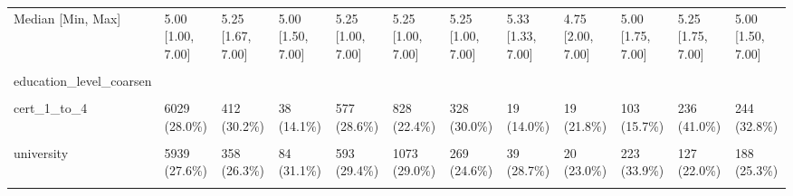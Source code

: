 \documentclass[
  single column]{article}
\begin{document}
\begin{landscape}
\begin{longtable}[t]{llllllllllll}
Median [Min, Max] & 5.00 [1.00, 7.00] & 5.25 [1.67, 7.00] & 5.00 [1.50, 7.00] & 5.25 [1.00, 7.00] & 5.25 [1.00, 7.00] & 5.25 [1.00, 7.00] & 5.33 [1.33, 7.00] & 4.75 [2.00, 7.00] & 5.00 [1.75, 7.00] & 5.25 [1.75, 7.00] & 5.00 [1.50, 7.00]\\
\cellcolor{gray!10}{Missing} & \cellcolor{gray!10}{66 (0.3\%)} & \cellcolor{gray!10}{3 (0.2\%)} & \cellcolor{gray!10}{0 (0\%)} & \cellcolor{gray!10}{7 (0.3\%)} & \cellcolor{gray!10}{18 (0.5\%)} & \cellcolor{gray!10}{1 (0.1\%)} & \cellcolor{gray!10}{0 (0\%)} & \cellcolor{gray!10}{0 (0\%)} & \cellcolor{gray!10}{3 (0.5\%)} & \cellcolor{gray!10}{4 (0.7\%)} & \cellcolor{gray!10}{4 (0.5\%)}\\
education\_level\_coarsen &  &  &  &  &  &  &  &  &  &  & \\
\addlinespace
\cellcolor{gray!10}{no\_qualification} & \cellcolor{gray!10}{322 (1.5\%)} & \cellcolor{gray!10}{15 (1.1\%)} & \cellcolor{gray!10}{1 (0.4\%)} & \cellcolor{gray!10}{24 (1.2\%)} & \cellcolor{gray!10}{41 (1.1\%)} & \cellcolor{gray!10}{30 (2.7\%)} & \cellcolor{gray!10}{0 (0\%)} & \cellcolor{gray!10}{2 (2.3\%)} & \cellcolor{gray!10}{26 (4.0\%)} & \cellcolor{gray!10}{8 (1.4\%)} & \cellcolor{gray!10}{23 (3.1\%)}\\
cert\_1\_to\_4 & 6029 (28.0\%) & 412 (30.2\%) & 38 (14.1\%) & 577 (28.6\%) & 828 (22.4\%) & 328 (30.0\%) & 19 (14.0\%) & 19 (21.8\%) & 103 (15.7\%) & 236 (41.0\%) & 244 (32.8\%)\\
\cellcolor{gray!10}{cert\_5\_to\_6} & \cellcolor{gray!10}{2659 (12.3\%)} & \cellcolor{gray!10}{209 (15.3\%)} & \cellcolor{gray!10}{24 (8.9\%)} & \cellcolor{gray!10}{279 (13.8\%)} & \cellcolor{gray!10}{554 (15.0\%)} & \cellcolor{gray!10}{176 (16.1\%)} & \cellcolor{gray!10}{10 (7.4\%)} & \cellcolor{gray!10}{7 (8.0\%)} & \cellcolor{gray!10}{32 (4.9\%)} & \cellcolor{gray!10}{94 (16.3\%)} & \cellcolor{gray!10}{106 (14.2\%)}\\
university & 5939 (27.6\%) & 358 (26.3\%) & 84 (31.1\%) & 593 (29.4\%) & 1073 (29.0\%) & 269 (24.6\%) & 39 (28.7\%) & 20 (23.0\%) & 223 (33.9\%) & 127 (22.0\%) & 188 (25.3\%)\\
\cellcolor{gray!10}{post\_grad} & \cellcolor{gray!10}{3120 (14.5\%)} & \cellcolor{gray!10}{176 (12.9\%)} & \cellcolor{gray!10}{39 (14.4\%)} & \cellcolor{gray!10}{276 (13.7\%)} & \cellcolor{gray!10}{565 (15.3\%)} & \cellcolor{gray!10}{129 (11.8\%)} & \cellcolor{gray!10}{26 (19.1\%)} & \cellcolor{gray!10}{13 (14.9\%)} & \cellcolor{gray!10}{39 (5.9\%)} & \cellcolor{gray!10}{58 (10.1\%)} & \cellcolor{gray!10}{87 (11.7\%)}\\

\end{longtable}
\end{landscape}
\end{document}
